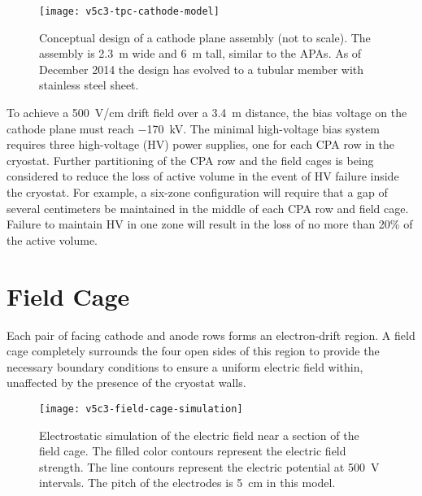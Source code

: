 \begin{figure}[htbp]
\centering
\texttt{[image: v5c3-tpc-cathode-model]}
\caption[Conceptual design of a cathode plane assembly]{Conceptual design of a cathode plane assembly (not to scale). 
The assembly is 2.3~m wide and 6~m tall, similar to the APAs. As of December 2014 the design has evolved to a tubular member with stainless steel sheet. }
\label{fig:tpc-cathode-model}
\end{figure}

To achieve a 500~V/cm drift field over a 3.4~m distance, the bias 
voltage on the cathode plane must reach $-$170~kV. The minimal high-voltage 
bias system requires three high-voltage (HV) power supplies, one for each CPA 
row in the cryostat. Further partitioning of the CPA row and the field cages is being considered to reduce the loss of active volume in the event of HV failure inside the cryostat. For example, a six-zone configuration will require that a gap of several centimeters be maintained in the middle of each CPA row and field cage.  Failure to maintain HV in one zone will result in the loss of no more than 20\% of the active volume. 
\section{Field Cage}
\label{subsec:v5-tpc-chamber-fieldcage}

Each pair of facing cathode and anode rows forms an electron-drift region. 
A field cage  completely surrounds the four open sides of this region
to provide the necessary boundary conditions to ensure a uniform electric field within, unaffected by the presence of the cryostat walls.

\begin{figure}[htbp]
\centering
\texttt{[image: v5c3-field-cage-simulation]}
\caption[Electrostatic simulation of electric field near a section 
of field cage]{Electrostatic simulation of the electric field near a section 
of the field cage.  The filled color contours represent the electric 
field strength.  The line contours represent the electric
potential at 500~V intervals.  The pitch of the electrodes is 5~cm in this model. }
\label{fig:tpc-field-cage}
\end{figure}    

